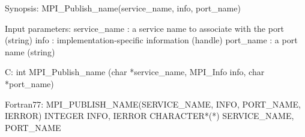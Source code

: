 Synopsis:
MPI_Publish_name(service_name, info, port_name)

Input parameters:
service_name : a service name to associate with the port (string)
info : implementation-specific information (handle)
port_name : a port name (string)

C:
int MPI_Publish_name
   (char *service_name, MPI_Info info, char *port_name)

Fortran77:
MPI_PUBLISH_NAME(SERVICE_NAME, INFO, PORT_NAME, IERROR)
INTEGER INFO, IERROR
CHARACTER*(*) SERVICE_NAME, PORT_NAME
